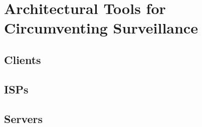 \section{Architectural Tools for Circumventing Surveillance}

\subsection{Clients}

\subsection{ISPs}

\subsection{Servers}
